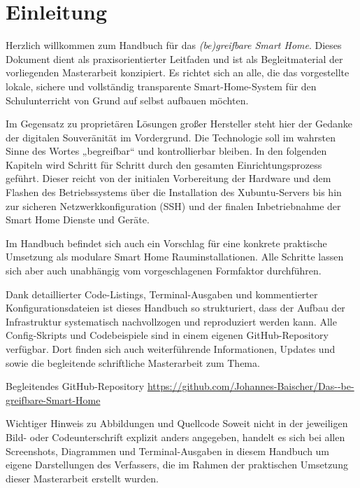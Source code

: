 \chapter{Einleitung}\label{chap:einleitung}

Herzlich willkommen zum Handbuch für das \emph{(be)greifbare Smart Home}. Dieses Dokument dient als praxisorientierter Leitfaden und ist als Begleitmaterial der vorliegenden Masterarbeit konzipiert. Es richtet sich an alle, die das vorgestellte lokale, sichere und vollständig transparente Smart-Home-System für den Schulunterricht von Grund auf selbst aufbauen möchten.

Im Gegensatz zu proprietären Lösungen großer Hersteller steht hier der Gedanke der digitalen Souveränität im Vordergrund. Die Technologie soll im wahrsten Sinne des Wortes „begreifbar“ und kontrollierbar bleiben. In den folgenden Kapiteln wird Schritt für Schritt durch den gesamten Einrichtungsprozess geführt. Dieser reicht von der initialen Vorbereitung der Hardware und dem Flashen des Betriebssystems über die Installation des Xubuntu-Servers bis hin zur sicheren Netzwerkkonfiguration (SSH) und der finalen Inbetriebnahme der Smart Home Dienste und Geräte.

Im Handbuch befindet sich auch ein Vorschlag für eine konkrete praktische Umsetzung als modulare Smart Home Rauminstallationen. Alle Schritte lassen sich aber auch unabhängig vom vorgeschlagenen Formfaktor durchführen.

Dank detaillierter Code-Listings, Terminal-Ausgaben und kommentierter Konfigurationsdateien ist dieses Handbuch so strukturiert, dass der Aufbau der Infrastruktur systematisch nachvollzogen und reproduziert werden kann. Alle Config-Skripts und Codebeispiele sind in einem eigenen GitHub-Repository verfügbar. Dort finden sich auch weiterführende Informationen, Updates und sowie die begleitende schriftliche Masterarbeit zum Thema.

\vspace{2em}

\begin{InfoBox}{Begleitendes GitHub-Repository}
\url{https://github.com/Johannes-Baischer/Das--be-greifbare-Smart-Home}
\end{InfoBox}


\vspace{2em}

\begin{InfoBox}{Wichtiger Hinweis zu Abbildungen und Quellcode}
\scriptsize
Soweit nicht in der jeweiligen Bild- oder Codeunterschrift explizit anders angegeben, handelt es sich bei allen Screenshots, Diagrammen und Terminal-Ausgaben in diesem Handbuch um eigene Darstellungen des Verfassers, die im Rahmen der praktischen Umsetzung dieser Masterarbeit erstellt wurden.
\end{InfoBox}